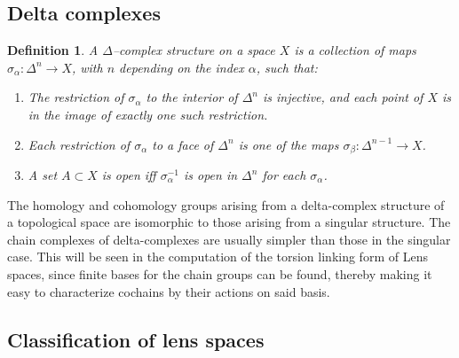 \documentclass{article}
\newtheorem{definition}[theorem]{Definition}
\begin{document}
\subsection{Delta complexes}
\begin{definition}
A $\Delta$--complex structure on a space $X$ is a collection of maps $\sigma_\alpha\colon\Delta^n\to X$, with $n$ depending on the index $\alpha$, such that:
\begin{enumerate}
    \item The restriction of $\sigma_\alpha$ to the interior of $\Delta^n$ is injective, and each point of $X$ is in the image of exactly one such restriction.
    \item Each restriction of $\sigma_\alpha$ to a face of $\Delta^n$ is one of the maps $\sigma_\beta\colon\Delta^{n-1}\to X$.
    \item A set $A\subset X$ is open iff $\sigma_\alpha^{-1}$ is open in $\Delta^n$ for each $\sigma_\alpha$.
\end{enumerate}
\end{definition}

The homology and cohomology groups arising from a delta-complex structure of a topological space are isomorphic to those arising from a singular structure. The chain complexes of delta-complexes are usually simpler than those in the singular case. This will be seen in the computation of the torsion linking form of Lens spaces, since finite bases for the chain groups can be found, thereby making it easy to characterize cochains by their actions on said basis.




\subsection{Classification of lens spaces}
\end{document}

